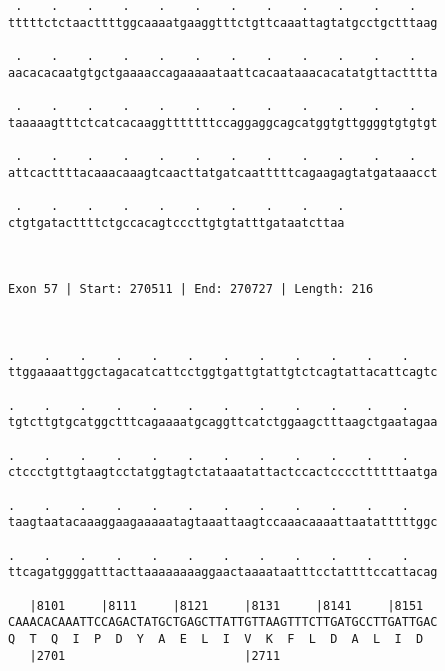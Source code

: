 \documentclass{article}
\begin{document}
\begin{Verbatim}
 .    .    .    .    .    .    .    .    .    .    .    .   
tttttctctaacttttggcaaaatgaaggtttctgttcaaattagtatgcctgctttaag
                                                            
 .    .    .    .    .    .    .    .    .    .    .    .   
aacacacaatgtgctgaaaaccagaaaaataattcacaataaacacatatgttactttta
                                                            
 .    .    .    .    .    .    .    .    .    .    .    .   
taaaaagtttctcatcacaaggtttttttccaggaggcagcatggtgttggggtgtgtgt
                                                            
 .    .    .    .    .    .    .    .    .    .    .    .   
attcacttttacaaacaaagtcaacttatgatcaatttttcagaagagtatgataaacct
                                                            
 .    .    .    .    .    .    .    .    .    .
ctgtgatacttttctgccacagtcccttgtgtatttgataatcttaa
                                               
                                               
 
Exon 57 | Start: 270511 | End: 270727 | Length: 216



.    .    .    .    .    .    .    .    .    .    .    .    
ttggaaaattggctagacatcattcctggtgattgtattgtctcagtattacattcagtc
                                                            
.    .    .    .    .    .    .    .    .    .    .    .    
tgtcttgtgcatggctttcagaaaatgcaggttcatctggaagctttaagctgaatagaa
                                                            
.    .    .    .    .    .    .    .    .    .    .    .    
ctccctgttgtaagtcctatggtagtctataaatattactccactccccttttttaatga
                                                            
.    .    .    .    .    .    .    .    .    .    .    .    
taagtaatacaaaggaagaaaaatagtaaattaagtccaaacaaaattaatatttttggc
                                                            
.    .    .    .    .    .    .    .    .    .    .    .    
ttcagatggggatttacttaaaaaaaaggaactaaaataatttcctattttccattacag
                                                            
   |8101     |8111     |8121     |8131     |8141     |8151  
CAAACACAAATTCCAGACTATGCTGAGCTTATTGTTAAGTTTCTTGATGCCTTGATTGAC
Q  T  Q  I  P  D  Y  A  E  L  I  V  K  F  L  D  A  L  I  D  
   |2701                         |2711                      
  

\end{Verbatim}
\end{document}
